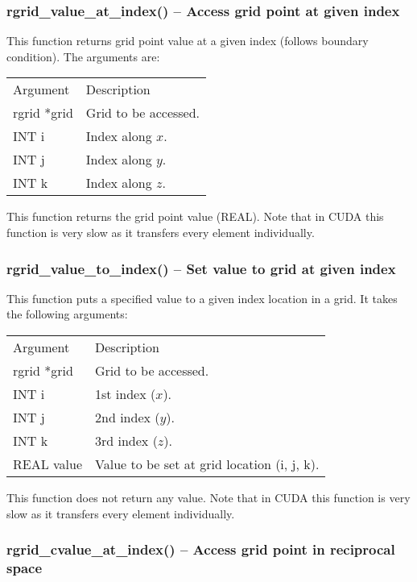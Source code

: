 \documentclass[12pt,letterpaper]{article}
\begin{document}
\subsubsection{rgrid\_value\_at\_index() -- Access grid point at given index}

This function returns grid point value at a given index (follows boundary condition). The arguments are:
\begin{longtable}{p{} p{}}
Argument & Description\\
\cline{1-2}
rgrid *grid & Grid to be accessed.\\
INT i & Index along $x$.\\
INT j & Index along $y$.\\
INT k & Index along $z$.\\
\end{longtable}
\noindent
This function returns the grid point value (REAL). Note that in CUDA this function is very slow as it transfers every element individually.

\subsubsection{rgrid\_value\_to\_index() -- Set value to grid at given index}

This function puts a specified value to a given index location in a grid. It takes the following arguments:
\begin{longtable}{p{} p{}}
Argument & Description\\
\cline{1-2}
rgrid *grid & Grid to be accessed.\\
INT i & 1st index ($x$).\\
INT j & 2nd index ($y$).\\
INT k & 3rd index ($z$).\\
REAL value & Value to be set at grid location (i, j, k).\\
\end{longtable}
\noindent
This function does not return any value. Note that in CUDA this function is very slow as it transfers every element individually.

\subsubsection{rgrid\_cvalue\_at\_index() -- Access grid point in reciprocal space}
\end{document}

